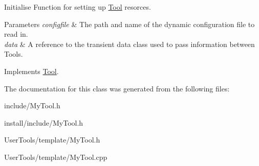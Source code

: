 Initialise Function for setting up \hyperlink{classTool}{Tool} resorces. 


\begin{DoxyParams}{Parameters}
{\em configfile} & The path and name of the dynamic configuration file to read in. \\
\hline
{\em data} & A reference to the transient data class used to pass information between Tools. \\
\hline
\end{DoxyParams}


Implements \hyperlink{classTool_a4b04a99172dfe09dc97927d1feaff0ce}{Tool}.



The documentation for this class was generated from the following files\-:\begin{DoxyCompactItemize}
\item 
include/My\-Tool.\-h\item 
install/include/My\-Tool.\-h\item 
User\-Tools/template/My\-Tool.\-h\item 
User\-Tools/template/My\-Tool.\-cpp\end{DoxyCompactItemize}
